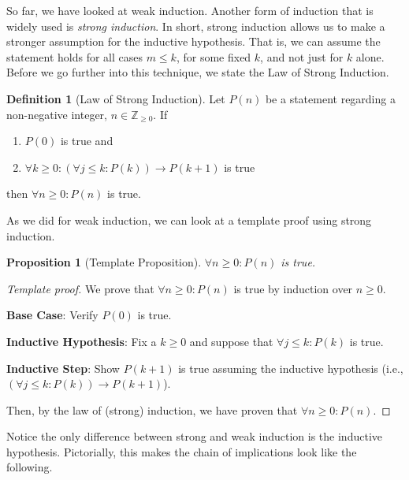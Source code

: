 \documentclass{article}
\theoremstyle{plain}
\newtheorem*{proposition*}{Proposition}
\theoremstyle{definition}
\newtheorem{definition}[theorem]{Definition}
\newcommand{\ra}{\rightarrow}
\newcommand{\ZZ}{\mathbb{Z}_{\geq 0}}
\begin{document}
So far, we have looked at weak induction. Another form of induction that is widely used is \emph{strong induction}. In short, strong induction allows us to make a stronger assumption for the inductive hypothesis. That is, we can assume the statement holds for all cases \(m \leq k\), for some fixed \(k\), and not just for \(k\) alone. Before we go further into this technique, we state the Law of Strong Induction.

\begin{definition}[Law of Strong Induction]
    Let \(P(n)\) be a statement regarding a non-negative integer, \(n \in \ZZ\). If
    \begin{enumerate}
        \item \(P(0)\) is true and
        \item \(\forall k \geq 0 : (\forall j \leq k :  P(k)) \ra P(k+1)\) is true
    \end{enumerate}    
    then \(\forall n \geq 0 : P(n)\) is true.
\end{definition}

As we did for weak induction, we can look at a template proof using strong induction.

\begin{proposition*}[Template Proposition]
    \(\forall n \geq 0 : P(n)\) is true.
\end{proposition*}
\begin{proof}[Template proof]
    We prove that \(\forall n \geq 0 : P(n)\) is true by induction over \(n \geq 0\).
    
    \textbf{Base Case}: Verify \(P(0)\) is true.

    \textbf{Inductive Hypothesis}: Fix a \(k \geq 0\) and suppose that \(\forall j \leq k: P(k)\) is true.

    \textbf{Inductive Step}: Show \(P(k+1)\) is true assuming the inductive hypothesis (i.e., \(\left(\forall j \leq k: P(k)\right) \ra P(k+1)\)).

    Then, by the law of (strong) induction, we have proven that \(\forall n \geq 0 : P(n)\).
\end{proof}

Notice the only difference between strong and weak induction is the inductive hypothesis. Pictorially, this makes the chain of implications look like the following.
\end{document}
